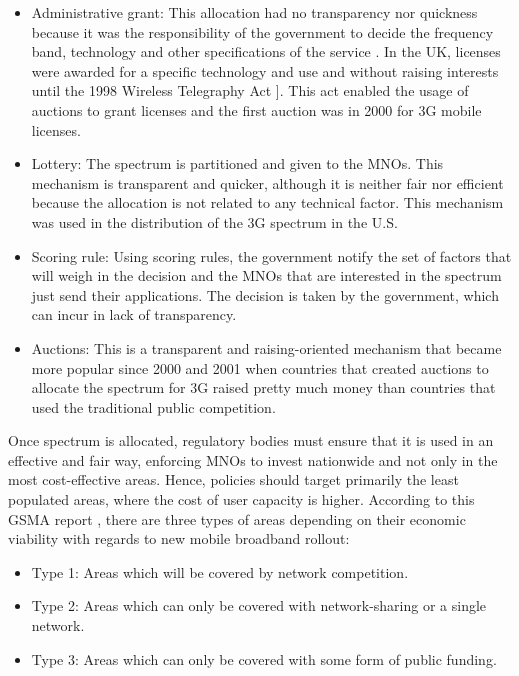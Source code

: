 \begin{itemize}
	\item Administrative grant: This allocation had no transparency nor quickness because it was the responsibility of the government to decide the frequency band, technology and other specifications of the service \cite{2-02}. In the UK, licenses were awarded for a specific technology and use and without raising interests until the 1998 Wireless Telegraphy Act \cite{2-06}]. This act enabled the usage of auctions to grant licenses and the first auction was in 2000 for 3G mobile licenses.\par

	\item Lottery: The spectrum is partitioned and given to the MNOs. This mechanism is transparent and quicker, although it is neither fair nor efficient because the allocation is not related to any technical factor. This mechanism was used in the distribution of the 3G spectrum in the U.S.\par

	\item Scoring rule: Using scoring rules, the government notify the set of factors that will weigh in the decision and the MNOs that are interested in the spectrum just send their applications. The decision is taken by the government, which can incur in lack of transparency.\par

	\item Auctions: This is a transparent and raising-oriented mechanism that became more popular since 2000 and 2001 when countries that created auctions to allocate the spectrum for 3G raised pretty much money than countries that used the traditional public competition.
\end{itemize}\par

Once spectrum is allocated, regulatory bodies must ensure that it is used in an effective and fair way, enforcing MNOs to invest nationwide and not only in the most cost-effective areas. Hence, policies should target primarily the least populated areas, where the cost of user capacity is higher. According to this GSMA report \cite{2-03}, there are three types of areas depending on their economic viability with regards to new mobile broadband rollout:\par

\begin{itemize}
	\item Type 1: Areas which will be covered by network competition.\par

	\item Type 2: Areas which can only be covered with network-sharing or a single network.\par

	\item Type 3: Areas which can only be covered with some form of public funding.
\end{itemize}\par

